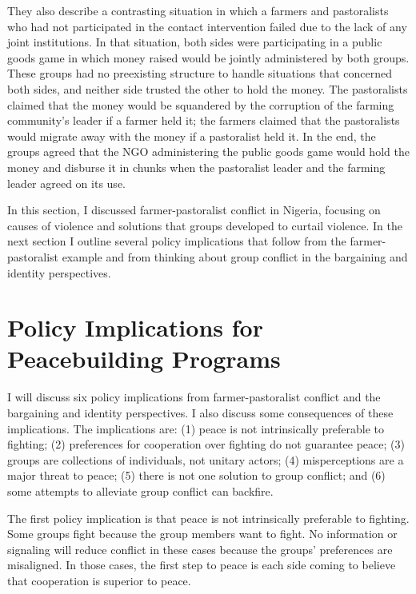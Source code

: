 \documentclass[11pt]{article}
\begin{document}
They also describe a contrasting situation in which a farmers and
pastoralists who had not participated in the contact intervention failed
due to the lack of any joint institutions. In that situation, both sides
were participating in a public goods game in which money raised would be
jointly administered by both groups. These groups had no preexisting
structure to handle situations that concerned both sides, and neither
side trusted the other to hold the money. The pastoralists claimed that
the money would be squandered by the corruption of the farming
community's leader if a farmer held it; the farmers claimed that the
pastoralists would migrate away with the money if a pastoralist held it.
In the end, the groups agreed that the NGO administering the public
goods game would hold the money and disburse it in chunks when the
pastoralist leader and the farming leader agreed on its use.

In this section, I discussed farmer-pastoralist conflict in Nigeria,
focusing on causes of violence and solutions that groups developed to
curtail violence. In the next section I outline several policy
implications that follow from the farmer-pastoralist example and from
thinking about group conflict in the bargaining and identity
perspectives.

\hypertarget{policy-implications-for-peacebuilding-programs}{%
\section{Policy Implications for Peacebuilding
Programs}\label{policy-implications-for-peacebuilding-programs}}

I will discuss six policy implications from farmer-pastoralist conflict
and the bargaining and identity perspectives. I also discuss some
consequences of these implications. The implications are: (1) peace is
not intrinsically preferable to fighting; (2) preferences for
cooperation over fighting do not guarantee peace; (3) groups are
collections of individuals, not unitary actors; (4) misperceptions are a
major threat to peace; (5) there is not one solution to group conflict;
and (6) some attempts to alleviate group conflict can backfire.

The first policy implication is that peace is not intrinsically
preferable to fighting. Some groups fight because the group members want
to fight. No information or signaling will reduce conflict in these
cases because the groups' preferences are misaligned. In those cases,
the first step to peace is each side coming to believe that cooperation
is superior to peace.
\end{document}
